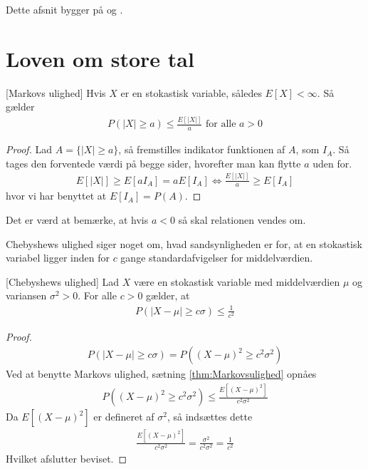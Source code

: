Dette afsnit bygger på \cite{sandsynlighedsBog} og \cite{grimsandsynlighedsBog}.
\section{Loven om store tal}
\begin{theorem} \label{thm:Markovsulighed}[Markovs ulighed]
Hvis $X$ er en stokastisk variable, således
$E[X] < \infty$. Så gælder
\begin{align*}
    P(|X|\geq a) \leq \frac{E[|X|]}{a} \text{ for alle } a > 0
\end{align*}
\end{theorem}
\begin{proof}
Lad $A=\{|X|\geq a\}$, så fremstilles indikator funktionen af $A$, som $I_A$. Så tages den forventede værdi på begge sider, hvorefter man kan flytte $a$ uden for.
\begin{align*}
E[|X|]\geq E[aI_A] = a E[I_A] \iff \frac{E[|X|]}{a}\geq E[I_A]
\end{align*} 
hvor vi har benyttet at $E[I_A] = P(A)$. 
\end{proof}
Det er værd at bemærke, at hvis $a<0$ så skal relationen vendes om.

Chebyshews ulighed siger noget om, hvad sandsynligheden er for, at en stokastisk variabel ligger inden for $c$ gange standardafvigelser for middelværdien.
\begin{theorem} \label{Thm:Chebyshewsulighed}[Chebyshews ulighed]
    Lad $X$ være en stokastisk variable med middelværdien $\mu$ og variansen $\sigma^2>0$. For alle $c>0$ gælder, at 
    \begin{align*}
        P(|X-\mu|\geq c \sigma)\leq \frac{1}{c^2}
    \end{align*} 
\end{theorem}
\begin{proof}%
    \begin{align*}
        P(|X-\mu|\geq c \sigma)=P((X-\mu)^2\geq c^2\sigma^2)
    \end{align*}
Ved at benytte Markovs ulighed, sætning \ref{thm:Markovsulighed} opnåes
\begin{align*}
    P((X-\mu)^2\geq c^2\sigma^2) \leq \frac{E[(X-\mu)^2]}{c^2\sigma^2}
\end{align*}
Da $E[(X-\mu)^2]$ er defineret af $\sigma^2$, så indsættes dette
\begin{align*}
    \frac{E[(X-\mu)^2]}{c^2\sigma^2} = \frac{\sigma^2}{c^2\sigma^2} = \frac{1}{c^2}
\end{align*}
Hvilket afslutter beviset.
\end{proof}

